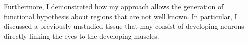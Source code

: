Furthermore, I demonstrated how my approach allows the generation of functional hypothesis about regions that are not well known. In particular, I discussed a previously unstudied tissue that may consist of developing neurons directly linking the eyes to the developing muscles.


